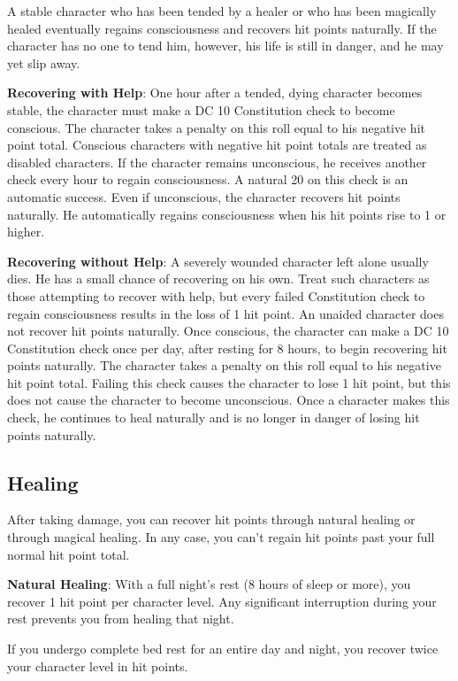 A stable character who has been tended by a healer or who has been magically healed eventually regains consciousness and recovers hit points naturally. If the character has no one to tend him, however, his life is still in danger, and he may yet slip away.
				
\textbf{Recovering with Help}: One hour after a tended, dying character becomes stable, the character must make a DC 10 Constitution check to become conscious. The character takes a penalty on this roll equal to his negative hit point total. Conscious characters with negative hit point totals are treated as disabled characters. If the character remains unconscious, he receives another check every hour to regain consciousness. A natural 20 on this check is an automatic success. Even if unconscious, the character recovers hit points naturally. He automatically regains consciousness when his hit points rise to 1 or higher.
				
\textbf{Recovering without Help}: A severely wounded character left alone usually dies. He has a small chance of recovering on his own. Treat such characters as those attempting to recover with help, but every failed Constitution check to regain consciousness results in the loss of 1 hit point. An unaided character does not recover hit points naturally. Once conscious, the character can make a DC 10 Constitution check once per day, after resting for 8 hours, to begin recovering hit points naturally. The character takes a penalty on this roll equal to his negative hit point total. Failing this check causes the character to lose 1 hit point, but this does not cause the character to become unconscious. Once a character makes this check, he continues to heal naturally and is no longer in danger of losing hit points naturally.
				
\subsection{Healing}

				
After taking damage, you can recover hit points through natural healing or through magical healing. In any case, you can't regain hit points past your full normal hit point total.
				
\textbf{Natural Healing}: With a full night's rest (8 hours of sleep or more), you recover 1 hit point per character level. Any significant interruption during your rest prevents you from healing that night.
				
If you undergo complete bed rest for an entire day and night, you recover twice your character level in hit points. 
				
